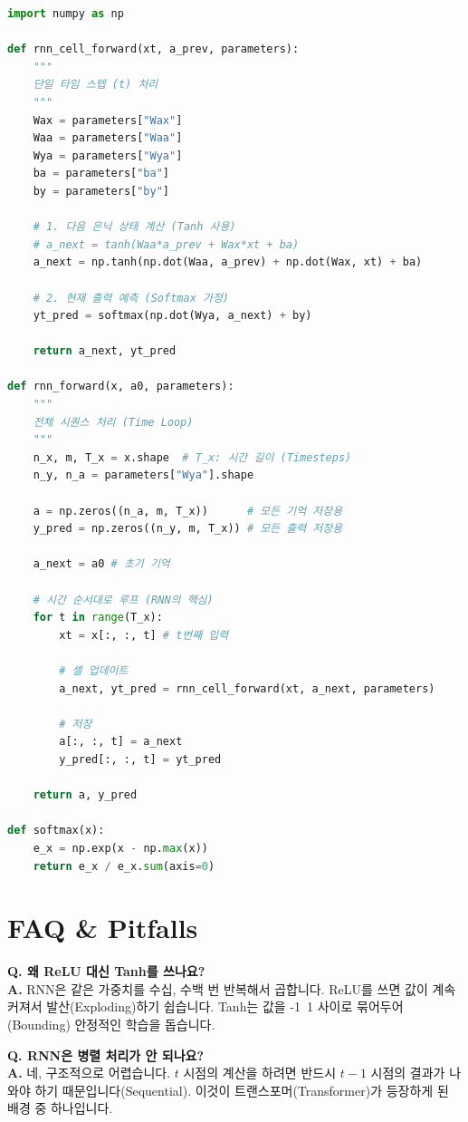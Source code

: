 \documentclass[11pt,a4paper]{book}
\theoremstyle{definition}
\begin{document}
\begin{lstlisting}[language=Python, caption=RNN Forward Pass Implementation, breaklines=true]
import numpy as np

def rnn_cell_forward(xt, a_prev, parameters):
    """
    단일 타임 스텝 (t) 처리
    """
    Wax = parameters["Wax"]
    Waa = parameters["Waa"]
    Wya = parameters["Wya"]
    ba = parameters["ba"]
    by = parameters["by"]

    # 1. 다음 은닉 상태 계산 (Tanh 사용)
    # a_next = tanh(Waa*a_prev + Wax*xt + ba)
    a_next = np.tanh(np.dot(Waa, a_prev) + np.dot(Wax, xt) + ba)
    
    # 2. 현재 출력 예측 (Softmax 가정)
    yt_pred = softmax(np.dot(Wya, a_next) + by)
    
    return a_next, yt_pred

def rnn_forward(x, a0, parameters):
    """
    전체 시퀀스 처리 (Time Loop)
    """
    n_x, m, T_x = x.shape  # T_x: 시간 길이 (Timesteps)
    n_y, n_a = parameters["Wya"].shape
    
    a = np.zeros((n_a, m, T_x))      # 모든 기억 저장용
    y_pred = np.zeros((n_y, m, T_x)) # 모든 출력 저장용
    
    a_next = a0 # 초기 기억
    
    # 시간 순서대로 루프 (RNN의 핵심)
    for t in range(T_x):
        xt = x[:, :, t] # t번째 입력
        
        # 셀 업데이트
        a_next, yt_pred = rnn_cell_forward(xt, a_next, parameters)
        
        # 저장
        a[:, :, t] = a_next
        y_pred[:, :, t] = yt_pred
        
    return a, y_pred

def softmax(x):
    e_x = np.exp(x - np.max(x))
    return e_x / e_x.sum(axis=0)
\end{lstlisting}

\section{FAQ \& Pitfalls}

\textbf{Q. 왜 ReLU 대신 Tanh를 쓰나요?} \\
\textbf{A.} RNN은 같은 가중치를 수십, 수백 번 반복해서 곱합니다. ReLU를 쓰면 값이 계속 커져서 발산(Exploding)하기 쉽습니다. Tanh는 값을 -1~1 사이로 묶어두어(Bounding) 안정적인 학습을 돕습니다.

\textbf{Q. RNN은 병렬 처리가 안 되나요?} \\
\textbf{A.} 네, 구조적으로 어렵습니다. $t$ 시점의 계산을 하려면 반드시 $t-1$ 시점의 결과가 나와야 하기 때문입니다(Sequential). 이것이 트랜스포머(Transformer)가 등장하게 된 배경 중 하나입니다.
\end{document}
